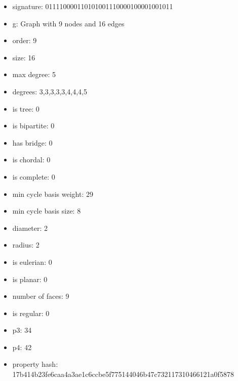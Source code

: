\newpage
\begin{figure}
\end{figure}
\begin{itemize}
\item signature: 011110000110101001110000100001001011
\item g: Graph with 9 nodes and 16 edges
\item order: 9
\item size: 16
\item max degree: 5
\item degrees: 3,3,3,3,3,4,4,4,5
\item is tree: 0
\item is bipartite: 0
\item has bridge: 0
\item is chordal: 0
\item is complete: 0
\item min cycle basis weight: 29
\item min cycle basis size: 8
\item diameter: 2
\item radius: 2
\item is eulerian: 0
\item is planar: 0
\item number of faces: 9
\item is regular: 0
\item p3: 34
\item p4: 42
\item property hash: 17b414b23fe6caa4a3ae1c6ccbe5f775144046b47c732117310466121a0f5878
\end{itemize}
